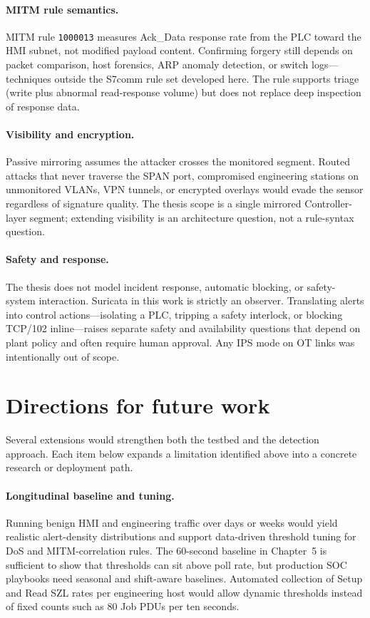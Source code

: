 \documentclass[../main.tex]{subfiles}
\begin{document}
\paragraph{MITM rule semantics.}
MITM rule \texttt{1000013} measures Ack\_Data response rate from the PLC toward the HMI subnet, not modified payload content. Confirming forgery still depends on packet comparison, host forensics, ARP anomaly detection, or switch logs---techniques outside the S7comm rule set developed here. The rule supports triage (write plus abnormal read-response volume) but does not replace deep inspection of response data.

\paragraph{Visibility and encryption.}
Passive mirroring assumes the attacker crosses the monitored segment. Routed attacks that never traverse the SPAN port, compromised engineering stations on unmonitored VLANs, VPN tunnels, or encrypted overlays would evade the sensor regardless of signature quality. The thesis scope is a single mirrored Controller-layer segment; extending visibility is an architecture question, not a rule-syntax question.

\paragraph{Safety and response.}
The thesis does not model incident response, automatic blocking, or safety-system interaction. Suricata in this work is strictly an observer. Translating alerts into control actions---isolating a PLC, tripping a safety interlock, or blocking TCP/102 inline---raises separate safety and availability questions that depend on plant policy and often require human approval. Any IPS mode on OT links was intentionally out of scope.

\section{Directions for future work}

Several extensions would strengthen both the testbed and the detection approach. Each item below expands a limitation identified above into a concrete research or deployment path.

\paragraph{Longitudinal baseline and tuning.}
Running benign HMI and engineering traffic over days or weeks would yield realistic alert-density distributions and support data-driven threshold tuning for DoS and MITM-correlation rules. The 60-second baseline in Chapter~5 is sufficient to show that thresholds can sit above poll rate, but production SOC playbooks need seasonal and shift-aware baselines. Automated collection of Setup and Read SZL rates per engineering host would allow dynamic thresholds instead of fixed counts such as 80 Job PDUs per ten seconds.
\end{document}
